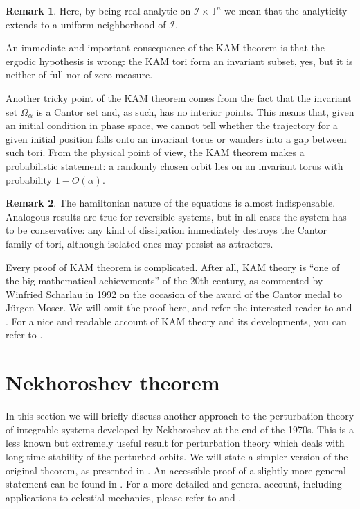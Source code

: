 \documentclass[english,fontsize=11pt,paper=b5]{scrbook}
\theoremstyle{definition}
\newtheorem{remark}{Remark}[chapter]
\begin{document}
      \begin{remark}
        Here, by being real analytic on $\overline{\mathcal{I}}\times\mathbb{T}^n$ we mean that the analyticity extends to a uniform neighborhood of $\mathcal{I}$.
      \end{remark}

      An immediate and important consequence of the KAM theorem is that the ergodic hypothesis is wrong: the KAM tori form an invariant subset, yes, but it is neither of full nor of zero measure.

      Another tricky point of the KAM theorem comes from the fact that the invariant set $\Omega_\alpha$ is a Cantor set and, as such, has no interior points.
      This means that, given an initial condition in phase space, we cannot tell whether the trajectory for a given initial position falls onto an invariant torus or wanders into a gap between such tori.
      From the physical point of view, the KAM theorem makes a probabilistic statement: a randomly chosen orbit lies on an invariant torus with probability $1-O(\alpha)$.

      \begin{remark}
        The hamiltonian nature of the equations is almost indispensable. Analogous results are true for reversible systems, but in all cases the system has to be conservative:
        any kind of dissipation immediately destroys the Cantor family of tori, although isolated ones may persist as attractors.
      \end{remark}

      Every proof of KAM theorem is complicated.
      After all, KAM theory is ``one of the big mathematical achievements'' of the 20th century, as commented by Winfried Scharlau in 1992 on the occasion of the award of the Cantor medal to J\"urgen Moser.
      We will omit the proof here, and refer the interested reader to \cite[Chapter 15]{book:knauf} and \cite{poschel2001}.
      For a nice and readable account of KAM theory and its developments, you can refer to \cite{Broer2004}.

      \section{Nekhoroshev theorem}

      In this section we will briefly discuss another approach to the perturbation theory of integrable systems developed by Nekhoroshev at the end of the 1970s.
      This is a less known but extremely useful result for perturbation theory which deals with long time stability of the perturbed orbits.
      We will state a simpler version of the original theorem, as presented in \cite{Benettin1985}.
      An accessible proof of a slightly more general statement can be found in \cite{Poschel1993}.
      For a more detailed and general account, including applications to celestial mechanics, please refer to \cite[Chapter 8]{book:celletti} and \cite[Chapter 6]{book:arnoldcelestial}.
\end{document}
